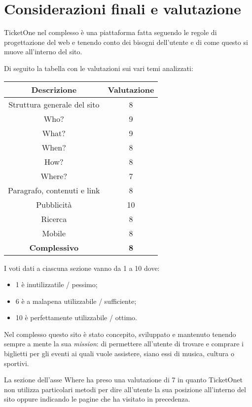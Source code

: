 \section{Considerazioni finali e valutazione}\label{conclusioni}

TicketOne nel complesso è una piattaforma fatta seguendo le regole di progettazione del web e tenendo conto dei bisogni dell'utente e di come questo si muove all'interno del sito.
\par Di seguito la tabella con le valutazioni sui vari temi analizzati:
\begin{center}
	\renewcommand{\arraystretch}{2}
	\setlength{\tabcolsep}{1.3cm} %
    \begin{tabular}{| c | c |}
		\hline
        \textbf{Descrizione} & \textbf{Valutazione} \\
        \hline \hline
        Struttura generale del sito & 8 \\\hline 
        Who? & 9 \\\hline 
        What? & 9 \\\hline 
        When? & 8 \\\hline 
        How? & 8 \\\hline
        Where? & 7 \\\hline 
        Paragrafo, contenuti e link & 8 \\\hline
        Pubblicità & 10 \\\hline 
        Ricerca & 8 \\\hline
        Mobile & 8 \\\hline \hline
        \textbf{Complessivo} & \textbf{8} \\\hline
    \end{tabular}
	\renewcommand{\arraystretch}{1}%
\end{center}
I voti dati a ciascuna sezione vanno da 1 a 10 dove:
\begin{itemize}[noitemsep]
	\item 1 è inutilizzatile / pessimo;
	\item 6 è a malapena utilizzabile / sufficiente;
	\item 10 è perfettamente utilizzabile / ottimo.
\end{itemize}
Nel complesso questo sito è stato concepito, sviluppato e mantenuto tenendo sempre a mente la sua \textit{mission}: di permettere all'utente di trovare e comprare i biglietti per gli eventi ai quali vuole assistere, siano essi di musica, cultura o sportivi.
\par La sezione dell'asse Where ha preso una valutazione di 7 in quanto TicketOnet non utilizza particolari metodi per dire all'utente la sua posizione all'interno del sito oppure indicando le pagine che ha visitato in precedenza.
